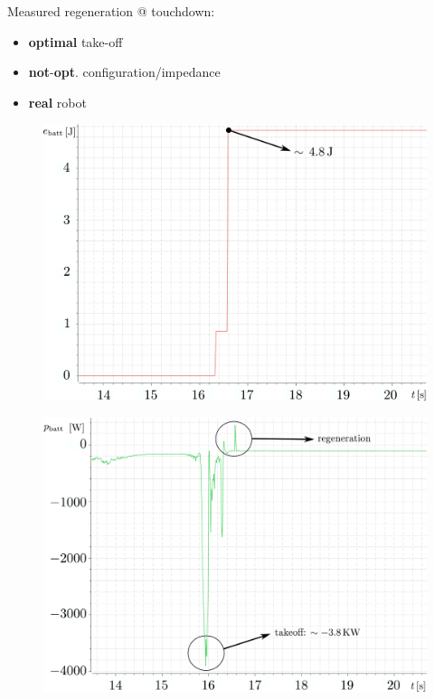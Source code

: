 \documentclass[aspectratio=169]{beamer}
\begin{document}
\begin{frame}
Measured regeneration @ touchdown:
\begin{itemize}
\item \textbf{optimal} take-off
\item \textbf{not}-\textbf{opt}. configuration/impedance
\item \textbf{real} robot
\end{itemize}
\begin{multicols}{2}
\begin{figure}
    \includegraphics[width=1.0\columnwidth]{beamer_imgs/reg_energy.pdf}
\end{figure}
\columnbreak
\begin{figure}
\includegraphics[width=1.0\columnwidth]{beamer_imgs/reg_pow.pdf}
\end{figure}
\end{multicols}
\end{frame}
\end{document}
